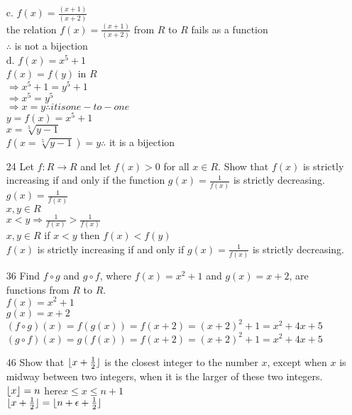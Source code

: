 \documentclass[a4paper]{article}
\newcommand\tab[1][0.5cm]{\hspace*{#1}}
\DeclarePairedDelimiter\floor{\lfloor}{\rfloor}
\begin{document}
\begin{itemize}
      c. $f(x) = \frac{(x + 1)}{(x + 2)}$ \\
      \tab the relation $f(x) = \frac{(x + 1)}{(x + 2)}$ from $R$ to $R$ fails as a function \\
      \tab $\therefore$ is not a bijection \\
      d. $f(x) = x^5 + 1$ \\
      \tab $f(x) = f(y)$ in $R$ \\
      \tab $\Rightarrow x^5 + 1 = y^5 + 1$ \\
      \tab $\Rightarrow x^5 = y^5$ \\
      \tab $\Rightarrow x = y \therefore it is one-to-one$ \\
      \tab $y = f(x) = x^5 + 1$ \\
      \tab $x = \sqrt[5]{y - 1}$ \\
      \tab $f(x = \sqrt[5]{y - 1}) = y \therefore$ it is a bijection
    \item[24] Let $f: R \rightarrow R$ and let $f(x) > 0$ for all $x \in R$. Show that $f(x)$ is strictly increasing if and only if the function $g(x) = \frac{1}{f(x)}$ is strictly decreasing. \\
    \tab $g(x) = \frac{1}{f(x)}$ \\ 
    \tab $x, y \in R$ \\
    \tab $x < y \Rightarrow \frac{1}{f(x)} > \frac{1}{f(x)}$ \\
    \tab $x, y \in R$ if $x < y$ then $f(x) < f(y)$ \\
    \tab $f(x)$ is strictly increasing if and only if $g(x) = \frac{1}{f(x)}$ is strictly decreasing.
    \item[36] Find $f \circ g$ and $g \circ f$, where $f(x) = x^2 + 1$ and $g(x) = x + 2$, are functions from $R$ to $R$. \\
    \tab $f(x) = x^2 + 1$ \\
    \tab $g(x) = x + 2$ \\
    \tab $(f \circ g)(x) = f(g(x)) = f(x + 2) = (x + 2)^2 + 1 = x^2 + 4x + 5$ \\
    \tab $(g \circ f)(x) = g(f(x)) = f(x + 2) = (x + 2)^2 + 1 = x^2 + 4x + 5$ 
    \item[46] Show that $\floor{x + \frac{1}{2}}$ is the closest integer to the number $x$, except when $x$ is midway between two integers, when it is the larger of these two integers. \\
    \tab $\floor{x} = n$ here$ x \leq x \leq n + 1$ \\
    \tab $\floor{x + \frac{1}{2}} = \floor{n + \epsilon + \frac{1}{2}}$ \\

\end{itemize}
\end{document}
